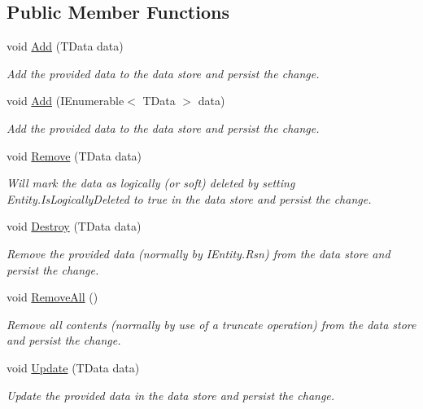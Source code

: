 \subsection*{Public Member Functions}
\begin{DoxyCompactItemize}
\item 
void \hyperlink{interfaceCqrs_1_1DataStores_1_1IDataStore_a114404daaf37fec9cc5547cd9a17858c}{Add} (T\+Data data)
\begin{DoxyCompactList}\small\item\em Add the provided {\itshape data}  to the data store and persist the change. \end{DoxyCompactList}\item 
void \hyperlink{interfaceCqrs_1_1DataStores_1_1IDataStore_a906f3f2f80db7a549a4170eca4653e26}{Add} (I\+Enumerable$<$ T\+Data $>$ data)
\begin{DoxyCompactList}\small\item\em Add the provided {\itshape data}  to the data store and persist the change. \end{DoxyCompactList}\item 
void \hyperlink{interfaceCqrs_1_1DataStores_1_1IDataStore_a7ef540796bbe4257296841590bc23478}{Remove} (T\+Data data)
\begin{DoxyCompactList}\small\item\em Will mark the {\itshape data}  as logically (or soft) deleted by setting Entity.\+Is\+Logically\+Deleted to true in the data store and persist the change. \end{DoxyCompactList}\item 
void \hyperlink{interfaceCqrs_1_1DataStores_1_1IDataStore_aa7ade96f2f3151d5353cf7bdbb2baec5}{Destroy} (T\+Data data)
\begin{DoxyCompactList}\small\item\em Remove the provided {\itshape data}  (normally by I\+Entity.\+Rsn) from the data store and persist the change. \end{DoxyCompactList}\item 
void \hyperlink{interfaceCqrs_1_1DataStores_1_1IDataStore_aead8d7a39a717d29af05daf7b64bea94}{Remove\+All} ()
\begin{DoxyCompactList}\small\item\em Remove all contents (normally by use of a truncate operation) from the data store and persist the change. \end{DoxyCompactList}\item 
void \hyperlink{interfaceCqrs_1_1DataStores_1_1IDataStore_a6d5d4dd572de8db01ff0c48d37faefa7}{Update} (T\+Data data)
\begin{DoxyCompactList}\small\item\em Update the provided {\itshape data}  in the data store and persist the change. \end{DoxyCompactList}\end{DoxyCompactItemize}


